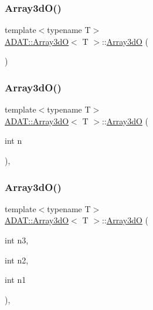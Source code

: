\subsubsection{\texorpdfstring{Array3dO()}{Array3dO()}\hspace{0.1cm}{\footnotesize\ttfamily [1/8]}}
{\footnotesize\ttfamily template$<$typename T$>$ \\
\mbox{\hyperlink{classADAT_1_1Array3dO}{A\+D\+A\+T\+::\+Array3dO}}$<$ T $>$\+::\mbox{\hyperlink{classADAT_1_1Array3dO}{Array3dO}} (\begin{DoxyParamCaption}{ }\end{DoxyParamCaption})\hspace{0.3cm}{\ttfamily [inline]}}

\mbox{\label{classADAT_1_1Array3dO_a4546b7e563774cfcdbe0be19cabbb854}} 
\subsubsection{\texorpdfstring{Array3dO()}{Array3dO()}\hspace{0.1cm}{\footnotesize\ttfamily [2/8]}}
{\footnotesize\ttfamily template$<$typename T$>$ \\
\mbox{\hyperlink{classADAT_1_1Array3dO}{A\+D\+A\+T\+::\+Array3dO}}$<$ T $>$\+::\mbox{\hyperlink{classADAT_1_1Array3dO}{Array3dO}} (\begin{DoxyParamCaption}\item[{int}]{n }\end{DoxyParamCaption})\hspace{0.3cm}{\ttfamily [inline]}, {\ttfamily [explicit]}}

\mbox{\label{classADAT_1_1Array3dO_aed93788a8b6356d91260f6a5afa80f9b}} 
\subsubsection{\texorpdfstring{Array3dO()}{Array3dO()}\hspace{0.1cm}{\footnotesize\ttfamily [3/8]}}
{\footnotesize\ttfamily template$<$typename T$>$ \\
\mbox{\hyperlink{classADAT_1_1Array3dO}{A\+D\+A\+T\+::\+Array3dO}}$<$ T $>$\+::\mbox{\hyperlink{classADAT_1_1Array3dO}{Array3dO}} (\begin{DoxyParamCaption}\item[{int}]{n3,  }\item[{int}]{n2,  }\item[{int}]{n1 }\end{DoxyParamCaption})\hspace{0.3cm}{\ttfamily [inline]}, {\ttfamily [explicit]}}

